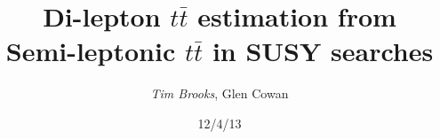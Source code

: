 \documentclass{beamer}
\title[Dilepton $t \bar{t}$ estimation\hspace{14em}\insertframenumber/9]{Di-lepton $t \bar{t}$ estimation from \\ Semi-leptonic $t \bar{t}$ in SUSY searches}
\author{\emph{Tim Brooks}, Glen Cowan}
\institute{Royal Holloway University of London}
\date{12/4/13}
\begin{document}
\begin{frame}
\titlepage
\end{frame}



%
%

%
%
\end{document}

